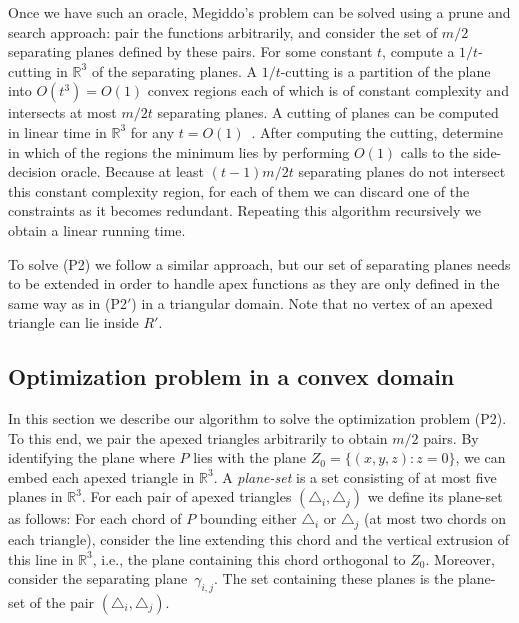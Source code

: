 \documentclass[a4paper,UKenglish]{lipics}
\newcommand{\reg}{\ensuremath{R'}}
\begin{document}
Once we have such an oracle, Megiddo's problem can be solved using a prune and search approach: pair the functions arbitrarily, and consider the set of $m/2$ separating planes defined by these pairs. For some constant $t$, compute a $1/t$-cutting in $\mathbb{R}^3$ of the separating planes.
A $1/t$-cutting is a partition of the plane into $O(t^3) = O(1)$ convex regions each of which is of constant complexity and intersects at most $m/2t$ separating planes.
A cutting of planes can be computed in linear time in $\mathbb{R}^3$ for any $t = O(1)$~\cite{matousekCuttings}.
After computing the cutting, determine in which of the regions the minimum lies by performing $O(1)$ calls to the side-decision oracle. 
Because at least $(t-1)m/2t$ separating planes do not intersect this constant complexity region, for each of them we can discard one of the constraints as it becomes redundant. Repeating this algorithm recursively we obtain a linear running time.

To solve (P2) we follow a similar approach, but our set of separating planes needs to be extended in order to handle apex functions as they are only defined in the same way as in (P2$'$) in a triangular domain.
Note that no vertex of an apexed triangle can lie inside $\reg$.

\subsection{Optimization problem in a convex domain}
In this section we describe our algorithm to solve the optimization problem (P2). 
To this end, we pair the apexed triangles arbitrarily to obtain $m/2$ pairs.
By identifying the plane where $P$ lies with the plane $Z_0 = \{(x,y,z): z = 0\}$, we can embed each apexed triangle in $\mathbb{R}^3$.
A \emph{plane-set} is a set consisting of at most five planes in $\mathbb{R}^3$.
For each pair of apexed triangles $(\triangle_i, \triangle_j)$ we define its plane-set as follows: 
For each chord of $P$ bounding either $\triangle_i$ or $\triangle_j$ (at most two chords on each triangle), consider the line extending this chord and the vertical extrusion of this line in $\mathbb{R}^3$, i.e., the plane containing this chord orthogonal to $Z_0$. Moreover, consider the separating plane~$\gamma_{i,j}$. The set containing these planes is the plane-set of the pair $(\triangle_i, \triangle_j)$.
\end{document}
